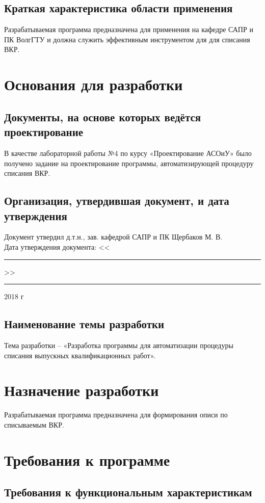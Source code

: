 \documentclass[14pt, a4paper]{extarticle}
\begin{document}
	\subsection{Краткая характеристика области применения}
	Разрабатываемая программа предназначена для применения на кафедре САПР и ПК ВолгГТУ и должна служить эффективным инструментом для для списания ВКР.
	
	\section{Основания для разработки}
	\subsection{Документы, на основе которых ведётся проектирование}
	В качестве лабораторной работы №4 по курсу «Проектирование АСОиУ» было получено задание на проектирование программы, автоматизирующей процедуру списания ВКР.
	\subsection{Организация, утвердившая документ, и дата утверждения}
	Документ утвердил д.т.н., зав. кафедрой САПР и ПК Щербаков М. В.\\
	Дата утверждения документа: <<\rule{7mm}{0.4pt}>> \rule{35mm}{0.4pt} 2018 г
	\subsection{Наименование темы разработки}
	Тема разработки – «Разработка программы для автоматизации процедуры списания выпускных квалификационных работ».
	
	\section{Назначение разработки}
	Разрабатываемая программа предназначена для формирования описи по списываемым ВКР.
	
	\section{Требования к программе}
	\subsection{Требования к функциональным характеристикам}
\end{document}
